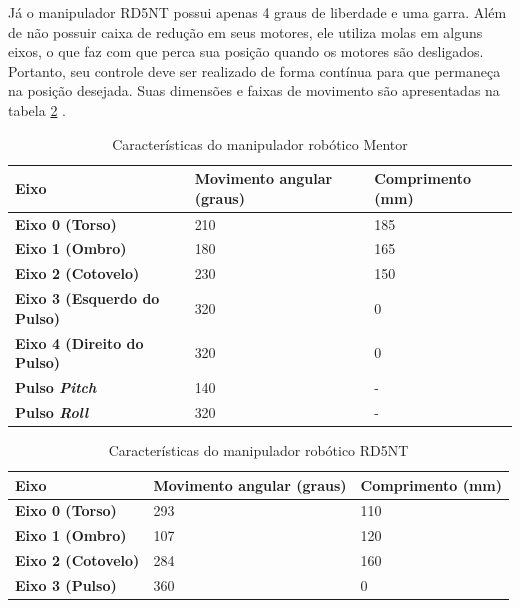 Já o manipulador RD5NT possui apenas 4 graus de liberdade e uma garra.
Além de não possuir caixa de redução em seus motores, ele utiliza molas em alguns eixos, o que faz com que perca sua posição quando os motores são desligados.
Portanto, seu controle deve ser realizado de forma contínua para que permaneça na posição desejada.
Suas dimensões e faixas de movimento são apresentadas na tabela \ref{tab:caracteristicasManipuladorRD5NT} \cite{controle_neural_robo}.

\begin{table}
    \centering
    \caption{Características do manipulador robótico Mentor}
    \label{tab:caracteristicasManipuladorMentor}
    \begin{tabular}{|l|l|l|}
        \hline
        \textbf{Eixo} & \textbf{Movimento angular (graus)} & \textbf{Comprimento (mm)} \\ \hline
        \textbf{Eixo 0 (Torso)}                    & 210 & 185 \\ \hline
        \textbf{Eixo 1 (Ombro)}                    & 180 & 165 \\ \hline
        \textbf{Eixo 2 (Cotovelo)}                 & 230 & 150 \\ \hline
        \textbf{Eixo 3 (Esquerdo do Pulso)}        & 320 & 0 \\ \hline
        \textbf{Eixo 4 (Direito do Pulso)}         & 320 & 0 \\ \hline
        \textbf{Pulso \textit{Pitch}}              & 140 & - \\ \hline
        \textbf{Pulso \textit{Roll}}               & 320 & - \\ \hline
    \end{tabular}
\end{table}

\begin{table}
    \centering
    \caption{Características do manipulador robótico RD5NT}
    \label{tab:caracteristicasManipuladorRD5NT}
    \begin{tabular}{|l|l|l|}
        \hline
        \textbf{Eixo} & \textbf{Movimento angular (graus)} & \textbf{Comprimento (mm)} \\ \hline
        \textbf{Eixo 0 (Torso)}            & 293 & 110 \\ \hline
        \textbf{Eixo 1 (Ombro)}            & 107 & 120 \\ \hline
        \textbf{Eixo 2 (Cotovelo)}         & 284 & 160 \\ \hline
        \textbf{Eixo 3 (Pulso)}            & 360 & 0 \\ \hline
    \end{tabular}
\end{table}

